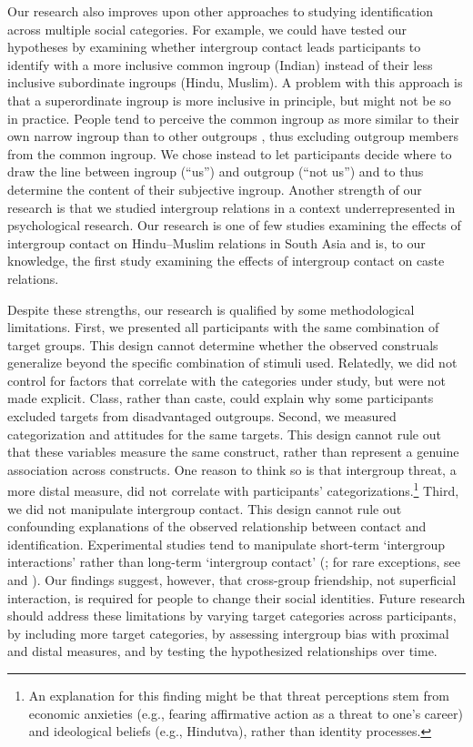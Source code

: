 \documentclass[12pt, a4paper]{article}
\begin{document}
Our research also improves upon other approaches to studying identification across multiple social categories. For example, we could have tested our hypotheses by examining whether intergroup contact leads participants to identify with a more inclusive common ingroup (Indian) instead of their less inclusive subordinate ingroups (Hindu, Muslim). A problem with this approach is that a superordinate ingroup is more inclusive in principle, but might not be so in practice. People tend to perceive the common ingroup as more similar to their own narrow ingroup than to other outgroups \cite{wenzel_ingroup_2003}, thus excluding outgroup members from the common ingroup. We chose instead to let participants decide where to draw the line between ingroup (``us'') and outgroup (``not us'') and to thus determine the content of their subjective ingroup. Another strength of our research is that we studied intergroup relations in a context underrepresented in psychological research. Our research is one of few studies examining the effects of intergroup contact on Hindu--Muslim relations in South Asia \cite<for other examples, see>{islam_dimensions_1993, tausch_relationships_2009} and is, to our knowledge, the first study examining the effects of intergroup contact on caste relations.

Despite these strengths, our research is qualified by some methodological limitations. First, we presented all participants with the same combination of target groups. This design cannot determine whether the observed construals generalize beyond the specific combination of stimuli used. Relatedly, we did not control for factors that correlate with the categories under study, but were not made explicit. Class, rather than caste, could explain why some participants excluded targets from disadvantaged outgroups. Second, we measured categorization and attitudes for the same targets. This design cannot rule out that these variables measure the same construct, rather than represent a genuine association across constructs. One reason to think so is that intergroup threat, a more distal measure, did not correlate with participants' categorizations.\footnote{An explanation for this finding might be that threat perceptions stem from economic anxieties (e.g., fearing affirmative action as a threat to one's career) and ideological beliefs (e.g., Hindutva), rather than identity processes.} Third, we did not manipulate intergroup contact. This design cannot rule out confounding explanations of the observed relationship between contact and identification. Experimental studies tend to manipulate short-term `intergroup interactions' rather than long-term `intergroup contact' (; for rare exceptions, see  and ). Our findings suggest, however, that cross-group friendship, not superficial interaction, is required for people to change their social identities. Future research should address these limitations by varying target categories across participants, by including more target categories, by assessing intergroup bias with proximal and distal measures, and by testing the hypothesized relationships over time.
\end{document}
